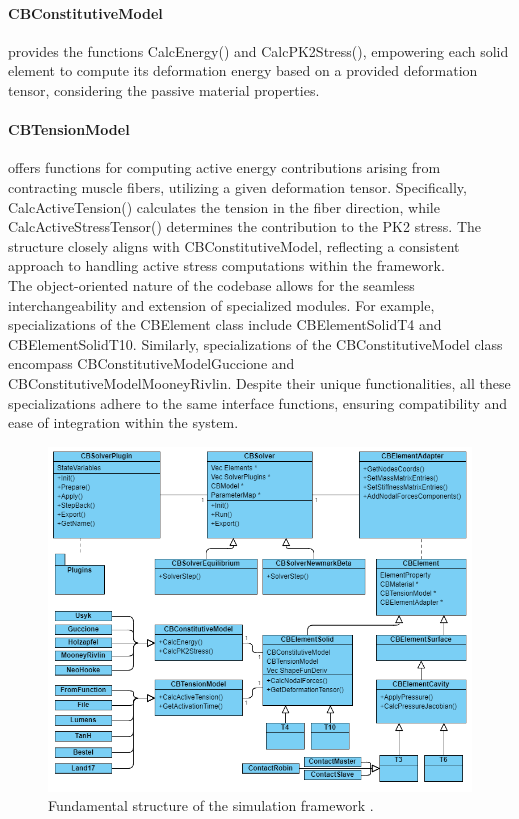 \paragraph{CBConstitutiveModel} provides the functions CalcEnergy() and CalcPK2Stress(), empowering each solid element to compute its deformation energy based on a provided deformation tensor, considering the passive material properties. 

\paragraph{CBTensionModel} offers functions for computing active energy contributions arising from contracting muscle fibers, utilizing a given deformation tensor. 
Specifically, CalcActiveTension() calculates the tension in the fiber direction, while CalcActiveStressTensor() determines the contribution to the PK2 stress. 
The structure closely aligns with CBConstitutiveModel, reflecting a consistent approach to handling active stress computations within the framework.\\

The object-oriented nature of the codebase allows for the seamless interchangeability and extension of specialized modules. 
For example, specializations of the CBElement class include CBElementSolidT4 and CBElementSolidT10. 
Similarly, specializations of the CBConstitutiveModel class encompass CBConstitutiveModelGuccione and CBConstitutiveModelMooneyRivlin. 
Despite their unique functionalities, all these specializations adhere to the same interface functions, ensuring compatibility and ease of integration within the system.

\begin{figure}[h!t]
    \centering
    \includegraphics[width=1\linewidth]{Graphics/CardioMechanics_ClassDiagram.png}
    \caption{Fundamental structure of the simulation framework \CM.}
    \label{fig:UML}
\end{figure}

